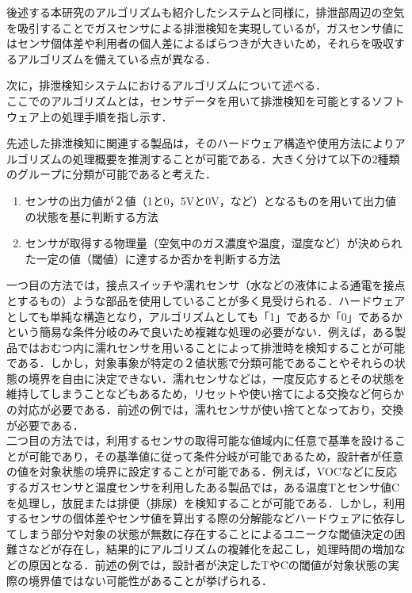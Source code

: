 後述する本研究のアルゴリズムも紹介したシステムと同様に，排泄部周辺の空気を吸引することでガスセンサによる排泄検知を実現しているが，ガスセンサ値にはセンサ個体差や利用者の個人差によるばらつきが大きいため，それらを吸収するアルゴリズムを備えている点が異なる．

次に，排泄検知システムにおけるアルゴリズムについて述べる．\\
ここでのアルゴリズムとは，センサデータを用いて排泄検知を可能とするソフトウェア上の処理手順を指し示す．

先述した排泄検知に関連する製品は，そのハードウェア構造や使用方法によりアルゴリズムの処理概要を推測することが可能である．大きく分けて以下の2種類のグループに分類が可能であると考えた．

\begin{enumerate}
\item センサの出力値が２値（1と0，5Vと0V，など）となるものを用いて出力値の状態を基に判断する方法
\item センサが取得する物理量（空気中のガス濃度や温度，湿度など）が決められた一定の値（閾値）に達するか否かを判断する方法
\end{enumerate}

一つ目の方法では，接点スイッチや濡れセンサ（水などの液体による通電を接点とするもの）ような部品を使用していることが多く見受けられる．ハードウェアとしても単純な構造となり，アルゴリズムとしても「1」であるか「0」であるかという簡易な条件分岐のみで良いため複雑な処理の必要がない．例えば，ある製品ではおむつ内に濡れセンサを用いることによって排泄時を検知することが可能である．しかし，対象事象が特定の２値状態で分類可能であることやそれらの状態の境界を自由に決定できない．濡れセンサなどは，一度反応するとその状態を維持してしまうことなどもあるため，リセットや使い捨てによる交換など何らかの対応が必要である．前述の例では，濡れセンサが使い捨てとなっており，交換が必要である．\\
二つ目の方法では，利用するセンサの取得可能な値域内に任意で基準を設けることが可能であり，その基準値に従って条件分岐が可能であるため，設計者が任意の値を対象状態の境界に設定することが可能である．例えば，VOCなどに反応するガスセンサと温度センサを利用したある製品では，ある温度Tとセンサ値Cを処理し，放屁または排便（排尿）を検知することが可能である．しかし，利用するセンサの個体差やセンサ値を算出する際の分解能などハードウェアに依存してしまう部分や対象の状態が無数に存在することによるユニークな閾値決定の困難さなどが存在し，結果的にアルゴリズムの複雑化を起こし，処理時間の増加などの原因となる．前述の例では，設計者が決定したTやCの閾値が対象状態の実際の境界値ではない可能性があることが挙げられる．

